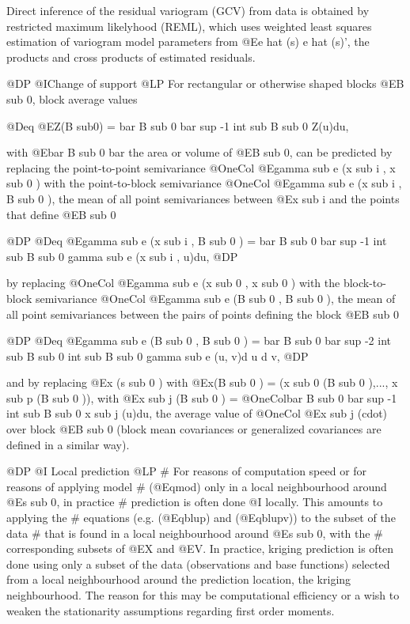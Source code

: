 \documentclass{article}
\begin{document}
Direct inference of the residual variogram (GCV) from data is obtained
by restricted maximum likelyhood (REML), which uses weighted least
squares estimation of variogram model parameters from @E{e hat (s) e hat
(s)'}, the products and cross products of estimated residuals.

@DP
@I{Change of support}
@LP
For rectangular or otherwise shaped blocks @E{B sub 0}, block average
values

@Deq {@E{Z(B sub{0}) = bar B sub 0 bar sup -1 int sub {B sub 0} Z(u)du},}

with @E{bar B sub 0 bar} the area or volume of @E{B sub 0}, can be
predicted by replacing the point-to-point semivariance @OneCol @E{gamma
sub e (x sub i , x sub 0 )} with the point-to-block semivariance @OneCol
@E{gamma sub e (x sub i , B sub 0 )}, the mean of all point
semivariances between @E{x sub i} and the points that define @E{B sub 0}

@DP
@Deq {@E{gamma sub e (x sub i , B sub 0 ) = bar B sub 0 bar sup -1
int sub {B sub 0} gamma sub e (x sub i , u)du},}
@DP

by replacing @OneCol @E{gamma sub e (x sub 0 , x sub 0 )} with the
block-to-block semivariance @OneCol @E{gamma sub e (B sub 0 , B sub 0
)}, the mean of all point semivariances between the pairs of points
defining the block @E{B sub 0}

@DP
@Deq {@E{gamma sub e (B sub 0 , B sub 0 ) = bar B sub 0 bar sup -2
int sub {B sub 0} int sub {B sub 0} gamma sub e (u, v)d u d v},}
@DP

and by replacing @E{x (s sub 0 )} with @E{x(B sub 0 ) = (x sub 0 (B
sub 0 ),..., x sub p (B sub 0 ))}, with @E{x sub j (B sub 0 ) =
@OneCol{bar B sub 0 bar sup -1 int sub {B sub 0} x sub j (u)du}}, the
average value of @OneCol @E{x sub j (cdot)} over block @E{B sub 0}
(block mean covariances or generalized covariances are defined in a
similar way).

@DP
@I { Local prediction }
@LP
# For reasons of computation speed or for reasons of applying model
# (@Eqmod) only in a local neighbourhood around @E{s sub 0}, in practice
# prediction is often done @I locally. This amounts to applying the
# equations (e.g. (@Eqblup) and (@Eqblupv)) to the subset of the data
# that is found in a local neighbourhood around @E{s sub 0}, with the
# corresponding subsets of @E{X} and @E{V}.
In practice, kriging prediction is often done using only a subset of the
data (observations and base functions) selected from a local
neighbourhood around the prediction location, the kriging neighbourhood.
The reason for this may be computational efficiency or a wish to weaken
the stationarity assumptions regarding first order moments.
\end{document}
